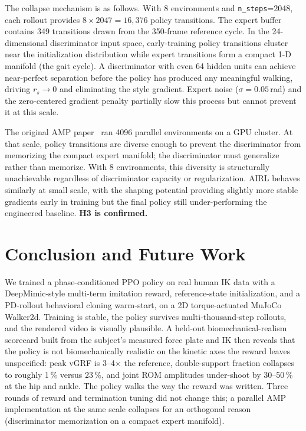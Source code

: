 \documentclass{article}
\begin{document}
The collapse mechanism is as follows. With 8 environments and \texttt{n\_steps}=2048, each rollout provides $8 \times 2047 = 16{,}376$ policy transitions. The expert buffer contains 349 transitions drawn from the 350-frame reference cycle. In the 24-dimensional discriminator input space, early-training policy transitions cluster near the initialization distribution while expert transitions form a compact 1-D manifold (the gait cycle). A discriminator with even 64 hidden units can achieve near-perfect separation before the policy has produced any meaningful walking, driving $r_s \to 0$ and eliminating the style gradient. Expert noise ($\sigma = 0.05$\,rad) and the zero-centered gradient penalty partially slow this process but cannot prevent it at this scale.

The original AMP paper~\cite{escontrela2022amp} ran 4096 parallel environments on a GPU cluster. At that scale, policy transitions are diverse enough to prevent the discriminator from memorizing the compact expert manifold; the discriminator must generalize rather than memorize. With 8 environments, this diversity is structurally unachievable regardless of discriminator capacity or regularization. AIRL behaves similarly at small scale, with the shaping potential providing slightly more stable gradients early in training but the final policy still under-performing the engineered baseline. \textbf{H3 is confirmed.}

\section{Conclusion and Future Work}
\label{sec:conclusion}

We trained a phase-conditioned PPO policy on real human IK data with a DeepMimic-style multi-term imitation reward, reference-state initialization, and a PD-rollout behavioral cloning warm-start, on a 2D torque-actuated MuJoCo Walker2d. Training is stable, the policy survives multi-thousand-step rollouts, and the rendered video is visually plausible. A held-out biomechanical-realism scorecard built from the subject's measured force plate and IK then reveals that the policy is not biomechanically realistic on the kinetic axes the reward leaves unspecified: peak vGRF is 3--4$\times$ the reference, double-support fraction collapses to roughly 1\,\% versus 23\,\%, and joint ROM amplitudes under-shoot by 30--50\,\% at the hip and ankle. The policy walks the way the reward was written. Three rounds of reward and termination tuning did not change this; a parallel AMP implementation at the same scale collapses for an orthogonal reason (discriminator memorization on a compact expert manifold).
\end{document}
